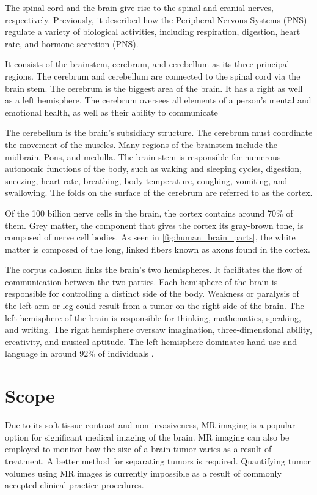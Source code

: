The spinal cord and the brain give rise to the spinal and cranial nerves, respectively.
Previously, it described how the Peripheral Nervous Systems (PNS) regulate a
variety of biological activities, including respiration, digestion, heart rate, and
hormone secretion (PNS). 

It consists of the brainstem, cerebrum, and cerebellum as its three principal regions. The cerebrum and cerebellum are connected to the spinal cord via the brain stem. The cerebrum is the biggest area of the brain. It has a right as well as a left hemisphere. The cerebrum oversees all elements of a person's
mental and emotional health, as well as their ability to communicate

The cerebellum is the brain's subsidiary structure. The cerebrum must coordinate the movement of the muscles. Many regions of the brainstem include the midbrain, Pons, and medulla. The brain stem is responsible for numerous autonomic functions of the body, such as waking and sleeping cycles, digestion,
sneezing, heart rate, breathing, body temperature, coughing, vomiting, and swallowing. The folds on the surface of the cerebrum are referred to as the cortex.

Of the 100 billion nerve cells in the brain, the cortex contains around 70\% of them. Grey matter, the component that gives the cortex its gray-brown tone, is composed of nerve cell bodies. As seen in \ref{fig:human_brain_parts}, the white matter is composed of the long, linked fibers known as axons found in the cortex.

 The corpus callosum links the brain's two hemispheres. It facilitates the flow of communication between the two parties. Each hemisphere of the brain is responsible for controlling a distinct side of the body. Weakness or paralysis of the left arm or leg could result from a tumor on the right side of the brain. The left hemisphere of the brain is responsible for thinking, mathematics, speaking, and writing. The right hemisphere oversaw imagination, three-dimensional ability, creativity, and musical aptitude. The left hemisphere dominates hand use and language in around 92\% of individuals \cite{ma82}.

\section{Scope}

Due to its soft tissue contrast and non-invasiveness, MR imaging is a popular option for significant medical imaging of the brain. MR imaging can also be employed to monitor how the size of a brain tumor varies as a result of treatment. A better method for separating tumors is required. Quantifying tumor volumes using MR images is currently impossible as a result of commonly accepted clinical practice procedures.

